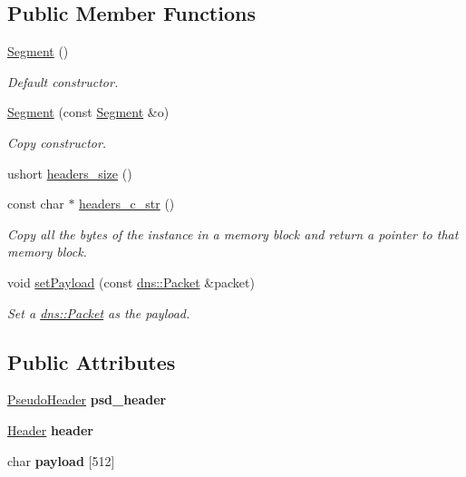\subsection*{Public Member Functions}
\begin{DoxyCompactItemize}
\item 
\hyperlink{structudp_1_1Segment_ac5bb0893a862d614ceaefcc3f76fc6da}{Segment} ()
\begin{DoxyCompactList}\small\item\em Default constructor. \end{DoxyCompactList}\item 
\hyperlink{structudp_1_1Segment_acc1762aaf9872190d9021a574123122c}{Segment} (const \hyperlink{structudp_1_1Segment}{Segment} \&o)
\begin{DoxyCompactList}\small\item\em Copy constructor. \end{DoxyCompactList}\item 
ushort \hyperlink{structudp_1_1Segment_ad3b9b073288d5aa58c503caa76c6481b}{headers\+\_\+size} ()
\item 
const char $\ast$ \hyperlink{structudp_1_1Segment_a0e04a50568add9be05b2f4b6bd93fd13}{headers\+\_\+c\+\_\+str} ()
\begin{DoxyCompactList}\small\item\em Copy all the bytes of the instance in a memory block and return a pointer to that memory block. \end{DoxyCompactList}\item 
void \hyperlink{structudp_1_1Segment_abe03349ffcc6719961fdc447d930dd37}{set\+Payload} (const \hyperlink{structdns_1_1Packet}{dns\+::\+Packet} \&packet)
\begin{DoxyCompactList}\small\item\em Set a \hyperlink{structdns_1_1Packet}{dns\+::\+Packet} as the payload. \end{DoxyCompactList}\end{DoxyCompactItemize}
\subsection*{Public Attributes}
\begin{DoxyCompactItemize}
\item 
\hyperlink{structudp_1_1PseudoHeader}{Pseudo\+Header} {\bfseries psd\+\_\+header}\hypertarget{structudp_1_1Segment_a56820c56012f0171ee1eb6015b26cafe}{}\label{structudp_1_1Segment_a56820c56012f0171ee1eb6015b26cafe}

\item 
\hyperlink{structudp_1_1Header}{Header} {\bfseries header}\hypertarget{structudp_1_1Segment_a835a6997845d3f83c668ac6fd8faa880}{}\label{structudp_1_1Segment_a835a6997845d3f83c668ac6fd8faa880}

\item 
char {\bfseries payload} \mbox{[}512\mbox{]}\hypertarget{structudp_1_1Segment_a93987612417850d7e464a9062dfb0789}{}\label{structudp_1_1Segment_a93987612417850d7e464a9062dfb0789}

\end{DoxyCompactItemize}


